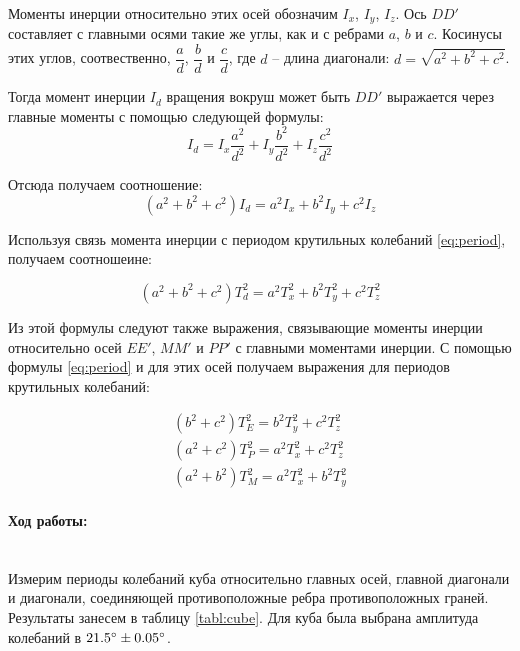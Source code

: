 \documentclass[a4paper, 12pt]{article}
\newcommand{\parag}[1]{\paragraph*{#1:}}
\begin{document}
Моменты инерции относительно этих осей обозначим $I_x$, $I_y$, $I_z$. Ось $DD'$ составляет с главными осями такие же углы, как и с ребрами $a$, $b$ и $c$. Косинусы этих углов, соотвественно, $\dfrac{a}{d}$, $\dfrac{b}{d}$ и $\dfrac{c}{d}$, где $d$ -- длина диагонали: $d = \sqrt{a^2 + b^2 + c^2}$.

Тогда момент инерции $I_d$ вращения вокруш может быть $DD'$ выражается через главные моменты с помощью следующей формулы:
\begin{equation}
    I_d = I_x\frac{a^2}{d^2} + I_y\frac{b^2}{d^2} + I_z\frac{c^2}{d^2}
\end{equation}

Отсюда получаем соотношение:
\begin{equation}
    (a^2 + b^2 + c^2)I_d = a^2 I_x + b^2I_y + c^2I_z
\end{equation}

Используя связь момента инерции с периодом крутильных колебаний \eqref{eq:period}, получаем соотношеине:

\begin{equation}
    (a^2 + b^2 + c^2)T_d^2 = a^2T_x^2 + b^2T_y^2 + c^2T_z^2
\end{equation}

Из этой формулы следуют также выражения, связывающие моменты инерции относительно осей $EE'$, $MM'$ и $PP'$ с главными моментами инерции. С помощью формулы \eqref{eq:period} и для этих осей получаем выражения для периодов крутильных колебаний:

\begin{eqnarray}
    \label{eq:t_for_e}
    (b^2 + c^2)T_E^2 = b^2T_y^2 + c^2T_z^2 \\
    \label{eq:t_for_p}
    (a^2 + c^2)T_P^2 = a^2T_x^2 + c^2T_z^2\\
    \label{eq:t_for_m}
    (a^2 + b^2)T_M^2 = a^2T_x^2 + b^2T_y^2
\end{eqnarray}

\parag {Ход работы} ~\\

Измерим периоды колебаний куба относительно главных осей, главной диагонали и диагонали, соединяющей противоположные ребра противоположных граней. Результаты занесем в таблицу \ref{tabl:cube}. Для куба была выбрана амплитуда колебаний в $21.5\degree \pm 0.05\degree$.
\end{document}

